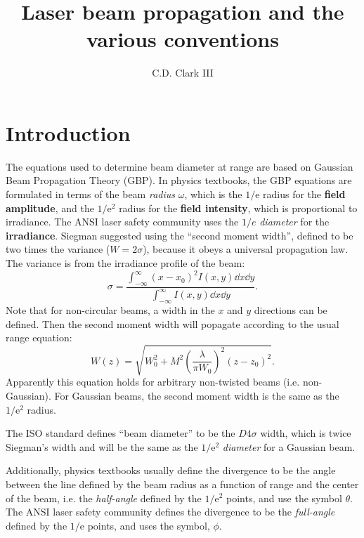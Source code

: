 \documentclass[]{article}
\author{C.D. Clark III}
\title{Laser beam propagation and the various conventions}
\begin{document}
\maketitle

\section{Introduction}

The equations used to determine beam diameter at range are based on Gaussian Beam Propagation Theory (GBP).
In physics textbooks, the GBP equations are formulated in terms of the beam \emph{radius} $\omega$, which
is the $1/\text{e}$ radius for the \textbf{field amplitude}, and the $1/\text{e}^2$ radius for the \textbf{field intensity}, which is proportional
to irradiance. The ANSI laser safety community uses the $1/e$ \emph{diameter} for the \textbf{irradiance}.
Siegman suggested using the ``second moment width'', defined to be two times the variance ($W = 2\sigma$),
because it obeys a universal propagation law. The variance is from the irradiance profile of the beam:
\begin{equation}
    \sigma = \frac{\int_{-\infty}^{\infty} (x-x_0)^2 I(x,y) \dd x \dd y}{ \int_{-\infty}^{\infty} I(x,y) \dd x \dd y} .
\end{equation}
Note that for non-circular beams, a width in the $x$ and $y$ directions can be defined.
Then the second moment width will popagate according to the usual range equation:
\begin{equation}
    W(z) = \sqrt{W_0^2 + M^2 \left(\frac{\lambda}{\pi W_0}\right)^2 (z - z_0)^2}.
\end{equation}
Apparently this equation holds for arbitrary non-twisted beams (i.e. non-Gaussian). For Gaussian beams, the second moment width
is the same as the $1/\text{e}^2$ radius.

The ISO standard defines ``beam diameter'' to be the $D4\sigma$ width, which is twice Siegman's width and will be the same as
the $1/\text{e}^2$ \emph{diameter} for a Gaussian beam.

Additionally, physics textbooks usually define the divergence to be the angle between the line defined by the beam
radius as a function of range and the center of the beam, i.e. the \emph{half-angle} defined by the $1/\text{e}^2$ points, and use
the symbol $\theta$. The ANSI laser safety community defines the divergence to be the \emph{full-angle} defined by the $1/\text{e}$ points, and uses the symbol, $\phi$.
\end{document}
